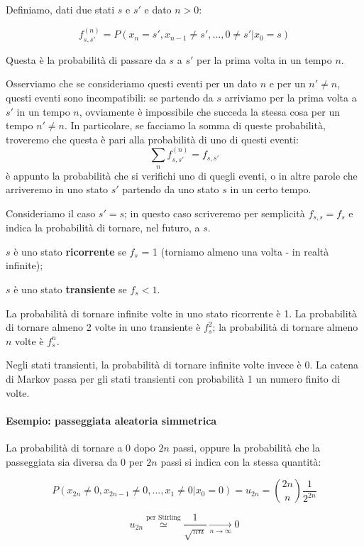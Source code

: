 \documentclass[a4paper,12pt]{book}
\begin{document}
Definiamo, dati due stati $ s $ e $ s' $ e dato $ n > 0 $:

$$ f^{(n)}_{s,s'} = P(x_n = s', x_{n-1} \ne s', ..., 0 \ne s' | x_0 = s)$$

Questa è la probabilità di passare da $ s $ a $ s' $ per la prima volta in un tempo $ n $. 

Osserviamo che se consideriamo questi eventi per un dato $ n $ e per un $ n' \ne n $, questi eventi sono incompatibili: se partendo da $ s $ arriviamo per la prima volta a $ s' $ in un tempo $ n $, ovviamente è impossibile che succeda la stessa cosa per un tempo $ n' \ne n $. 
In particolare, se facciamo la somma di queste probabilità, troveremo che questa è pari alla probabilità di uno di questi eventi:
$$ \sum_{n} f_{s,s'}^{(n)} = f_{s,s'} $$
è appunto la probabilità che si verifichi uno di quegli eventi, o in altre parole che arriveremo in uno stato $ s' $ partendo da uno stato $ s $ in un certo tempo. 

Consideriamo il caso $ s' = s $; in questo caso scriveremo per semplicità $ f_{s,s} = f_s $ e indica la probabilità di tornare, nel futuro, a $ s $. 

$ s $ è uno stato \textbf{ricorrente} se $ f_s $ = 1 (torniamo almeno una volta - in realtà infinite);

$ s $ è uno stato \textbf{transiente} se $ f_s < 1 $.

La probabilità di tornare infinite volte in uno stato ricorrente è 1. La probabilità di tornare almeno 2 volte in uno transiente è $ f_s^2 $; la probabilità di tornare almeno $ n $ volte è $ f_s^n $.

Negli stati transienti, la probabilità di tornare infinite volte invece è 0. La catena di Markov passa per gli stati transienti con probabilità 1 un numero finito di volte. 

\paragraph{Esempio: passeggiata aleatoria simmetrica}

La probabilità di tornare a 0 dopo $ 2n $ passi, oppure la probabilità che la passeggiata sia diversa da 0 per $ 2n $ passi si indica con la stessa quantità:

$$ P(x_{2n} \ne 0, x_{2n-1} \ne 0, ..., x_{1} \ne 0 | x_0 = 0) = u_{2n} = \binom{2n}{n}\frac{1}{2^{2n}}$$

$$u_{2n} \overset{ \text{per Stirling} }{\simeq} \frac{1}{\sqrt{\pi n}} \underset{n \to \infty}{\longrightarrow} 0$$
\end{document}
